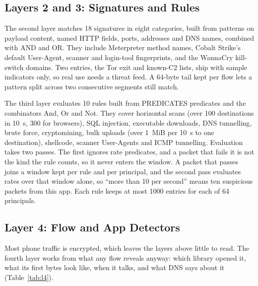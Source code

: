\documentclass[runningheads]{llncs}
\begin{document}
\subsection{Layers 2 and 3: Signatures and Rules}

The second layer matches 18 signatures in eight categories, built from patterns on payload content, named HTTP fields, ports, addresses and DNS names, combined with AND and OR. They include Meterpreter method names, Cobalt Strike's default User-Agent, scanner and login-tool fingerprints, and the WannaCry kill-switch domains. Two entries, the Tor exit and known-C2 lists, ship with sample indicators only, so real use needs a threat feed. A 64-byte tail kept per flow lets a pattern split across two consecutive segments still match.

The third layer evaluates 10 rules built from {{PREDICATES}} predicates and the combinators And, Or and Not. They cover horizontal scans (over 100 destinations in 10~s, 300 for browsers), SQL injection, executable downloads, DNS tunnelling, brute force, cryptomining, bulk uploads (over 1~MiB per 10~s to one destination), shellcode, scanner User-Agents and ICMP tunnelling. Evaluation takes two passes. The first ignores rate predicates, and a packet that fails it is not the kind the rule counts, so it never enters the window. A packet that passes joins a window kept per rule and per principal, and the second pass evaluates rates over that window alone, so ``more than 10 per second'' means ten suspicious packets from this app. Each rule keeps at most 1000 entries for each of 64 principals.

\subsection{Layer 4: Flow and App Detectors}\label{sec:layer4}

Most phone traffic is encrypted, which leaves the layers above little to read. The fourth layer works from what any flow reveals anyway: which library opened it, what its first bytes look like, when it talks, and what DNS says about it (Table~\ref{tab:l4}).
\end{document}
